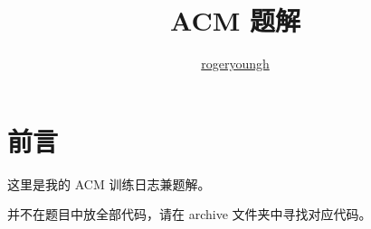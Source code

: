 \documentclass{probook}
\title{ACM 题解}
\author{\href{https://github.com/rogeryoungh}{rogeryoungh}}
\begin{document}
\newcommand\mfrac[2]{\dfrac{#1\smash[b]{\strut}}{#2\smash[t]{\strut}}}
\newcommand{\RR}{\mathbb{R}}
\newcommand{\NN}{\mathbb{N}}
\newcommand{\QQ}{\mathbb{Q}}
\newcommand{\ZZ}{\mathbb{Z}}
\newcommand{\ee}{\mathrm{e}}
\newcommand{\dd}{\mathrm{d}}
\newcommand{\uppi}{\mathrm{\pi}}
\newcommand{\eps}{\varepsilon}

\newcommand{\num}[1]{{\fzfs{（}}{\rm{#1}}{\fzfs{）}}}

\maketitle

\frontmatter

\chapter*{前言}

这里是我的 ACM 训练日志兼题解。

并不在题目中放全部代码，请在 archive 文件夹中寻找对应代码。

\tableofcontents

\mainmatter








\end{document}
